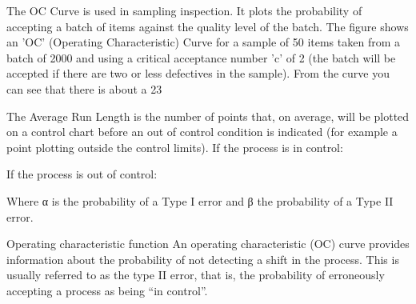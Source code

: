 \begin{frame}
The OC Curve is used in sampling inspection. It plots the probability of accepting a batch of items against the quality level of the batch. 
The figure shows an 'OC' (Operating Characteristic) Curve for a sample of 50 items taken from a batch of 2000 and using a critical acceptance number 'c' of 2 (the batch will be accepted if there are two or less defectives in the sample). From the curve you can see that there is about a 23%
\end{frame}
\begin{frame}
 The Average Run Length is the number of points that, on average, will be plotted on a control chart before an out of control condition is indicated (for example a point plotting outside the control limits).
If the process is in control:
 
If the process is out of control:
 
Where α is the probability of a Type I error and β the probability of a Type II error.
\end{frame}
\begin{frame}

Operating characteristic function
An operating characteristic (OC) curve provides information about the probability of not detecting a shift in the process. This is usually referred to as the type II error, that is, the probability of erroneously accepting a process as being “in control”.
\end{frame}


